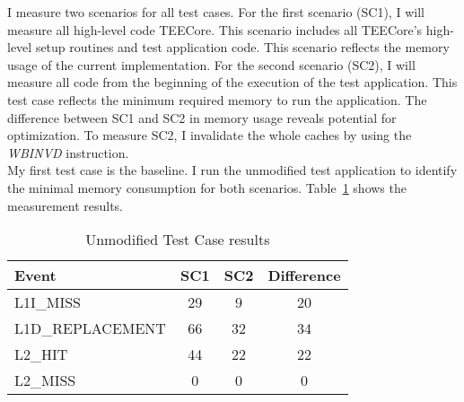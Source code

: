I measure two scenarios for all test cases. For the first scenario (SC1), I will
measure all high-level code TEECore. This scenario includes all TEECore's
high-level setup routines and test application code. This scenario reflects the
memory usage of the current implementation. For the second scenario (SC2), I
will measure all code from the beginning of the execution of the test
application. This test case reflects the minimum required memory to run the
application. The difference between SC1 and SC2 in memory usage reveals
potential for optimization. To measure SC2, I invalidate the whole caches by
using the \textit{WBINVD} instruction. \\

My first test case is the baseline. I run the unmodified test application to
identify the minimal memory consumption for both scenarios.
Table~\ref{50:tab:ping_base} shows the measurement results. 

\begin{table}[ht]
  \centering
  \begin{tabular}{ |l||c|c|c| }
    \hline
    Event            & SC1 & SC2 & Difference \\
    \hline
    L1I\_MISS        & 29  & 9   & 20         \\
    L1D\_REPLACEMENT & 66  & 32  & 34         \\
    L2\_HIT          & 44  & 22  & 22         \\
    L2\_MISS         & 0   & 0   & 0          \\
    \hline
  \end{tabular}
  \caption{Unmodified Test Case results}
  \label{50:tab:ping_base}
\end{table}

